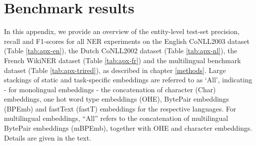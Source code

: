 \documentclass[12pt,a4paper,]{book}
\begin{document}
\newpage

\hypertarget{appendix-appendix}{%
\appendix}


\hypertarget{benchmark-results}{%
\chapter{Benchmark results}\label{benchmark-results}}

In this appendix, we provide an overview of the entity-level test-set precision, recall and F1-scores for all NER experiments on the English CoNLL2003 dataset (Table \ref{tab:apx-en}), the Dutch CoNLL2002 dataset (Table \ref{tab:apx-nl}), the French WikiNER dataset (Table \ref{tab:apx-fr}) and the multilingual benchmark dataset (Table \ref{tab:apx-trired}), as described in chapter \ref{methods}. Large stackings of static and task-specific embeddings are referred to as `All', indicating - for monolingual embeddings - the concatenation of character (Char) embeddings, one hot word type embeddings (OHE), BytePair embeddings (BPEmb) and fastText (fastT) embeddings for the respective languages. For multilingual embeddings, ``All'' refers to the concatenation of multilingual BytePair embeddings (mBPEmb), together with OHE and character embeddings. Details are given in the text.

\begingroup\fontsize{10}{12}\selectfont
\end{document}
